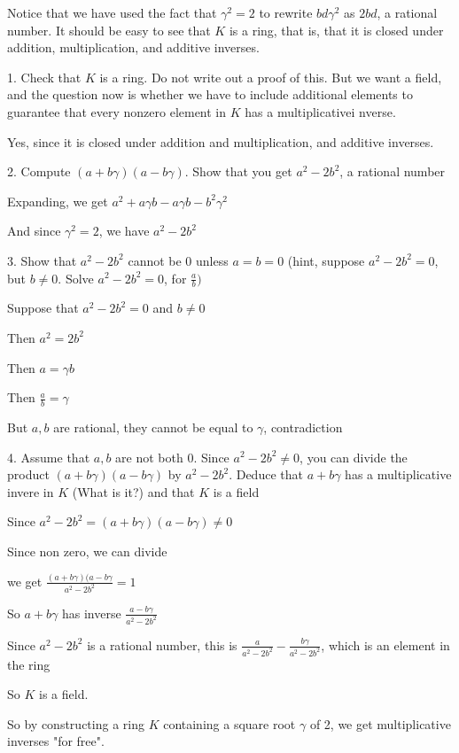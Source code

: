 \documentclass[12pt]{article}
\begin{document}
\begin{itemize}
	Notice that we have used the fact that $\gamma^2 = 2$ to rewrite $bd\gamma^2$ as $2bd$, a rational number. It should be easy to see that $K$ is a ring, that is, that it is closed under addition, multiplication, and additive inverses.

	1. Check that $K$ is a ring. Do not write out a proof of this. But we want a field, and the  question now is whether we have to include additional elements to guarantee that every nonzero element in $K$ has a multiplicativei nverse.

	Yes, since it is closed under addition and multiplication, and additive inverses.

	2. Compute $(a+b\gamma)(a -b\gamma)$. Show that you get $a^2 - 2b^2$, a rational number

	Expanding, we get $a^2 + a\gamma b - a\gamma b - b^2 \gamma^2$

	And since $\gamma^2 = 2$, we have $a^2 - 2b^2$

	3. Show that $a^2 - 2b^2$ cannot be 0 unless $a = b = 0$ (hint, suppose $a^2 - 2b^2 = 0$, but $b \neq 0$. Solve $a^2 - 2b^2 = 0$, for $\frac{a}{b})$

	Suppose that $a^2 - 2b^2 = 0$ and $b \neq 0$

	Then $a^2 = 2b^2$

	Then $a = \gamma b$

	Then $\frac{a}{b} = \gamma$

	But $a,b$ are rational, they cannot be equal to $\gamma$, contradiction

	4. Assume that $a,b$ are not both 0. Since $a^2 - 2b^2 \neq0$, you can divide the product $(a+b\gamma)(a-b\gamma)$ by $a^2 - 2b^2$. Deduce that $a+b\gamma$ has a multiplicative invere in $K$ (What is it?) and that $K$ is a field

	Since $a^2 -2b^2 = (a+b\gamma)(a-b\gamma) \neq 0$

	Since non zero, we can divide

	we get $\frac{(a+b\gamma)(a-b\gamma}{a^2 - 2b^2} = 1$

	So $a+b\gamma$ has inverse $\frac{a-b\gamma}{a^2 - 2b^2}$

	Since $a^2 - 2b^2$ is a rational number, this is $\frac{a}{a^2 - 2b^2} - \frac{b\gamma}{a^2 - 2b^2}$, which is an element in the ring

	So $K$ is a field.

	So by constructing a ring $K$ containing a square root $\gamma$ of 2, we get multiplicative inverses "for free".


\end{itemize}
\end{document}
